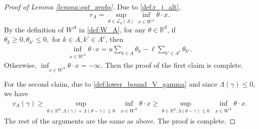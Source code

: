 \documentclass[aap,preprint]{imsart}
\newcommand{\bR}{{\mathbb{R}}}
\theoremstyle{plain}
\theoremstyle{definition}
\begin{document}
\begin{appendix}
\begin{proof}[Proof of Lemma  \ref{lemma:opt_probs}]    
Due to \eqref{def:r_j_alt},
$$
r_A = \sup_{\theta \in \mathcal{L}_0(\Lambda)} \inf_{x \in \overline{W^A}} \theta \cdot x.
$$
By the definition of $W^A$ in \eqref{def:W_A}, for any $\theta \in \bR^d$, if
$\theta_k \geq 0, \theta_{k'} \leq 0, \text{ for }k \in A, k' \in A^c$, then
\begin{align*}
    \inf_{x \in\overline{W^A}} \theta \cdot x = 
        u \sum_{k \in A} \theta_k - \ell \sum_{k' \in A^c} \theta_{k'}.
\end{align*}
Otherwise, $\inf_{x \in \overline{W^A}} \theta \cdot x = -\infty$. Then the proof of the first claim is complete.

For the second claim, due to \eqref{def:lower_bound_V_gamma} and since $\Lambda(\gamma) \leq 0$, we have
\begin{align*}
v_A(\gamma)  
\geq  
\sup_{\theta \in \bR^d: \Lambda(\gamma) + \Lambda(\theta-\gamma) \leq 0}\; \inf_{x \in \overline{W^A}} \theta \cdot x \geq 
\sup_{\theta \in \bR^d:  \Lambda(\theta-\gamma) \leq 0} \;\inf_{x \in \overline{W^A}} \theta \cdot x.
\end{align*}
The rest of the arguments are the same as above. The proof is complete.
\end{proof}


\end{appendix}
\end{document}
